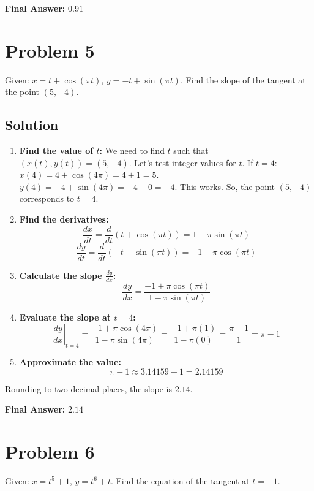 \documentclass{article}
\begin{document}
\textbf{Final Answer:} $0.91$

\section{Problem 5}
Given: $x = t + \cos(\pi t)$, $y = -t + \sin(\pi t)$. Find the slope of the tangent at the point $(5, -4)$.

\subsection*{Solution}
\begin{enumerate}
    \item \textbf{Find the value of $t$:} We need to find $t$ such that $(x(t), y(t)) = (5, -4)$.
    Let's test integer values for $t$.
    If $t=4$: $x(4) = 4 + \cos(4\pi) = 4 + 1 = 5$.
    $y(4) = -4 + \sin(4\pi) = -4 + 0 = -4$. This works.
    So, the point $(5, -4)$ corresponds to $t=4$.
    \item \textbf{Find the derivatives:}
    \[ \frac{dx}{dt} = \frac{d}{dt}(t + \cos(\pi t)) = 1 - \pi \sin(\pi t) \]
    \[ \frac{dy}{dt} = \frac{d}{dt}(-t + \sin(\pi t)) = -1 + \pi \cos(\pi t) \]
    \item \textbf{Calculate the slope $\frac{dy}{dx}$:}
    \[ \frac{dy}{dx} = \frac{-1 + \pi \cos(\pi t)}{1 - \pi \sin(\pi t)} \]
    \item \textbf{Evaluate the slope at $t=4$:}
    \[ \left.\frac{dy}{dx}\right|_{t=4} = \frac{-1 + \pi \cos(4\pi)}{1 - \pi \sin(4\pi)} = \frac{-1 + \pi(1)}{1 - \pi(0)} = \frac{\pi - 1}{1} = \pi - 1 \]
    \item \textbf{Approximate the value:}
    \[ \pi - 1 \approx 3.14159 - 1 = 2.14159 \]
\end{enumerate}
Rounding to two decimal places, the slope is $2.14$.

\textbf{Final Answer:} $2.14$

\section{Problem 6}
Given: $x = t^5 + 1$, $y = t^6 + t$. Find the equation of the tangent at $t = -1$.
\end{document}
